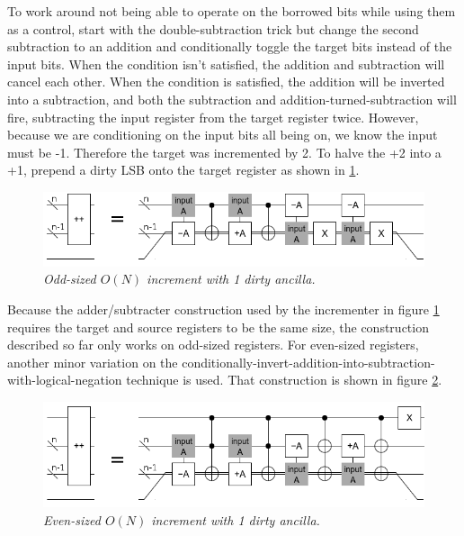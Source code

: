 \documentclass[twocolumn]{article}
\begin{document}
To work around not being able to operate on the borrowed bits while using them as a control, start with the double-subtraction trick but change the second subtraction to an addition and conditionally toggle the target bits instead of the input bits.
When the condition isn't satisfied, the addition and subtraction will cancel each other.
When the condition is satisfied, the addition will be inverted into a subtraction, and both the subtraction and addition-turned-subtraction will fire, subtracting the input register from the target register twice.
However, because we are conditioning on the input bits all being on, we know the input must be -1.
Therefore the target was incremented by 2.
To halve the +2 into a +1, prepend a dirty LSB onto the target register as shown in \ref{fig:compact-increment}.

\begin{figure}
  \centering
  \includegraphics[totalheight=1.5cm]{compact-increment.png}
  \caption{\em Odd-sized $O(N)$ increment with 1 dirty ancilla.}
  \label{fig:compact-increment}
\end{figure}

Because the adder/subtracter construction used by the incrementer in figure \ref{fig:compact-increment} requires the target and source registers to be the same size, the construction described so far only works on odd-sized registers.
For even-sized registers, another minor variation on the conditionally-invert-addition-into-subtraction-with-logical-negation technique is used.
That construction is shown in figure \ref{fig:compact-increment-even}.

\begin{figure}
  \centering
  \includegraphics[totalheight=2cm]{compact-increment-even.png}
  \caption{\em Even-sized $O(N)$ increment with 1 dirty ancilla.}
  \label{fig:compact-increment-even}
\end{figure}
\end{document}
